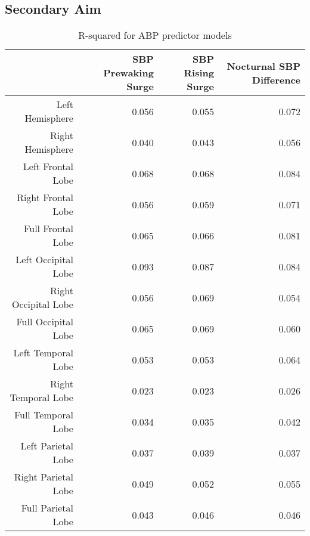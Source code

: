 \documentclass[10pt]{article}\usepackage[]{graphicx}\usepackage[]{color}
\begin{document}
\clearpage
\subsection{Secondary Aim}

\begin{table}[ht]
\centering
\caption{R-squared for ABP predictor models} 
\begin{tabular}{rrrr}
  \hline
 & SBP Prewaking Surge & SBP Rising Surge & Nocturnal SBP Difference \\ 
  \hline
Left Hemisphere & 0.056 & 0.055 & 0.072 \\ 
  Right Hemisphere & 0.040 & 0.043 & 0.056 \\ 
  Left Frontal Lobe & 0.068 & 0.068 & 0.084 \\ 
  Right Frontal Lobe & 0.056 & 0.059 & 0.071 \\ 
  Full Frontal Lobe & 0.065 & 0.066 & 0.081 \\ 
  Left Occipital Lobe & 0.093 & 0.087 & 0.084 \\ 
  Right Occipital Lobe & 0.056 & 0.069 & 0.054 \\ 
  Full Occipital Lobe & 0.065 & 0.069 & 0.060 \\ 
  Left Temporal Lobe & 0.053 & 0.053 & 0.064 \\ 
  Right Temporal Lobe & 0.023 & 0.023 & 0.026 \\ 
  Full Temporal Lobe & 0.034 & 0.035 & 0.042 \\ 
  Left Parietal Lobe & 0.037 & 0.039 & 0.037 \\ 
  Right Parietal Lobe & 0.049 & 0.052 & 0.055 \\ 
  Full Parietal Lobe & 0.043 & 0.046 & 0.046 \\ 
   \hline
\end{tabular}
\end{table}
\end{document}
